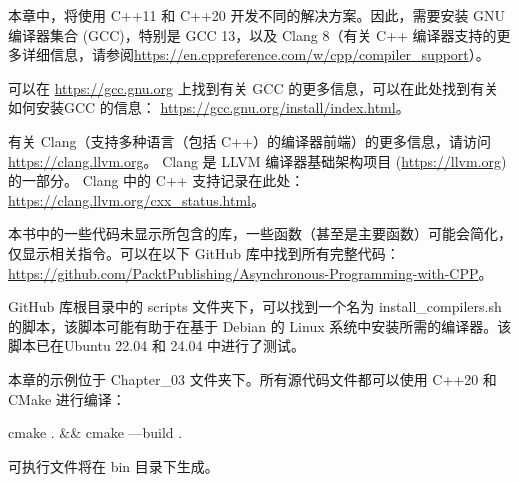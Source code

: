 
本章中，将使用 C++11 和 C++20 开发不同的解决方案。因此，需要安装 GNU 编译器集合 (GCC)，特别是 GCC 13，以及 Clang 8（有关 C++ 编译器支持的更多详细信息，请参阅\url{https://en.cppreference.com/w/cpp/compiler_support}）。

可以在 \url{https://gcc.gnu.org} 上找到有关 GCC 的更多信息，可以在此处找到有关如何安装GCC 的信息： \url{https://gcc.gnu.org/install/index.html}。

有关 Clang（支持多种语言（包括 C++）的编译器前端）的更多信息，请访问 \url{https://clang.llvm.org}。 Clang 是 LLVM 编译器基础架构项目 (\url{https://llvm.org}) 的一部分。 Clang 中的 C++ 支持记录在此处： \url{https://clang.llvm.org/cxx_status.html}。

本书中的一些代码未显示所包含的库，一些函数（甚至是主要函数）可能会简化，仅显示相关指令。可以在以下 GitHub 库中找到所有完整代码： \url{https://github.com/PacktPublishing/Asynchronous-Programming-with-CPP}。

GitHub 库根目录中的 scripts 文件夹下，可以找到一个名为 install\_compilers.sh 的脚本，该脚本可能有助于在基于 Debian 的 Linux 系统中安装所需的编译器。该脚本已在Ubuntu 22.04 和 24.04 中进行了测试。

本章的示例位于 Chapter\_03 文件夹下。所有源代码文件都可以使用 C++20 和 CMake 进行编译：

\begin{shell}
cmake . && cmake —build .
\end{shell}

可执行文件将在 bin 目录下生成。



